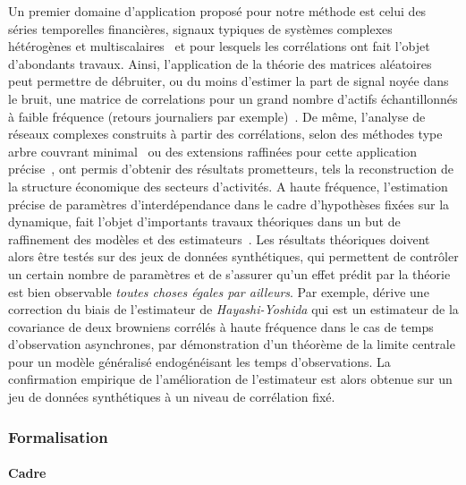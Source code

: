 Un premier domaine d'application proposé pour notre méthode est celui des séries temporelles financières, signaux typiques de systèmes complexes hétérogènes et multiscalaires~\cite{mantegna2000introduction} et pour lesquels les corrélations ont fait l'objet d'abondants travaux. Ainsi, l'application de la théorie des matrices aléatoires peut permettre de débruiter, ou du moins d'estimer la part de signal noyée dans le bruit, une matrice de correlations pour un grand nombre d'actifs échantillonnés à faible fréquence (retours journaliers par exemple)~\cite{2009arXiv0910.1205B}. De même, l'analyse de réseaux complexes construits à partir des corrélations, selon des méthodes type arbre couvrant minimal~\cite{2001PhyA..299...16B} ou des extensions raffinées pour cette application précise~\cite{tumminello2005tool}, ont permis d'obtenir des résultats prometteurs, tels la reconstruction de la structure économique des secteurs d'activités. A haute fréquence, l'estimation précise de paramètres d'interdépendance dans le cadre d'hypothèses fixées sur la dynamique, fait l'objet d'importants travaux théoriques dans un but de raffinement des modèles et des estimateurs~\cite{barndorff2011multivariate}. Les résultats théoriques doivent alors être testés sur des jeux de données synthétiques, qui permettent de contrôler un certain nombre de paramètres et de s'assurer qu'un effet prédit par la théorie est bien observable \emph{toutes choses égales par ailleurs}. Par exemple, \cite{potiron2015estimation} dérive une correction du biais de l'estimateur de \emph{Hayashi-Yoshida} qui est un estimateur de la covariance de deux browniens corrélés à haute fréquence dans le cas de temps d'observation asynchrones, par démonstration d'un théorème de la limite centrale pour un modèle généralisé endogénéisant les temps d'observations. La confirmation empirique de l'amélioration de l'estimateur est alors obtenue sur un jeu de données synthétiques à un niveau de corrélation fixé.


\subsubsection{Formalisation}

\paragraph{Cadre}

